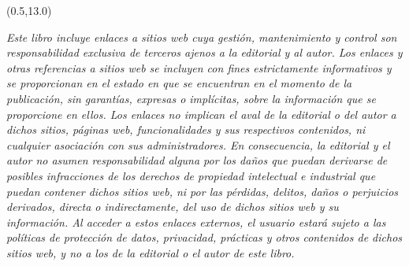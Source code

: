 \begin{center}
\begin{textblock}{15}(0.5,13.0)
    \raggedright
    {\scriptsize \textit{Este libro incluye enlaces a sitios web cuya gestión, mantenimiento y control son responsabilidad exclusiva de terceros ajenos a la editorial y al autor. Los enlaces y otras referencias a sitios web se incluyen con fines estrictamente informativos y se proporcionan en el estado en que se encuentran en el momento de la publicación, sin garantías, expresas o implícitas, sobre la información que se proporcione en ellos. Los enlaces no implican el aval de la editorial o del autor a dichos sitios, páginas web, funcionalidades y sus respectivos contenidos, ni cualquier asociación con sus administradores. En consecuencia, la editorial y el autor no asumen responsabilidad alguna por los daños que puedan derivarse de posibles infracciones de los derechos de propiedad intelectual e industrial que puedan contener dichos sitios web, ni por las pérdidas, delitos, daños o perjuicios derivados, directa o indirectamente, del uso de dichos sitios web y su información. Al acceder a estos enlaces externos, el usuario estará sujeto a las políticas de protección de datos, privacidad, prácticas y otros contenidos de dichos sitios web, y no a los de la editorial o el autor de este libro.}} \\[0.1cm]
\end{textblock}
\end{center}

\vfill
\clearpage